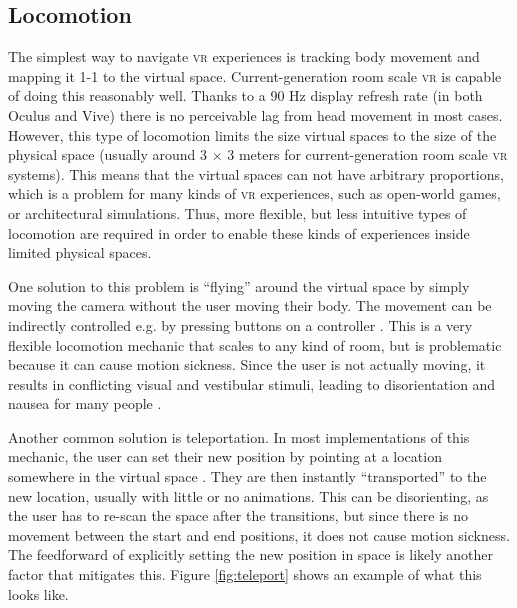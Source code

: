 \documentclass[nobib]{tufte-book} %
\begin{document}
\subsection{Locomotion}
The simplest way to navigate \textsc{vr} experiences is tracking body movement and mapping it 1-1 to the virtual space. Current-generation room scale \textsc{vr} is capable of doing this reasonably well. Thanks to a 90 Hz display refresh rate (in both Oculus and Vive) there is no perceivable lag from head movement in most cases. However, this type of locomotion limits the size virtual spaces to the size of the physical space (usually around $3$ $\times$ $3$ meters for current-generation room scale \textsc{vr} systems). This means that the virtual spaces can not have arbitrary proportions, which is a problem for many kinds of \textsc{vr} experiences, such as open-world games, or architectural simulations. Thus, more flexible, but less intuitive types of locomotion are required in order to enable these kinds of experiences inside limited physical spaces.

One solution to this problem is ``flying'' around the virtual space by simply moving the camera without the user moving their body. The movement can be indirectly controlled e.g. by pressing buttons on a controller \cite{bowman1996evaluation}. This is a very flexible locomotion mechanic that scales to any kind of room, but is problematic because it can cause motion sickness. Since the user is not actually moving, it results in conflicting visual and vestibular stimuli, leading to disorientation and nausea for many people \cite{akiduki2003visual}.

Another common solution is teleportation. In most implementations of this mechanic, the user can set their new position by pointing at a location somewhere in the virtual space \cite{bozgeyikli2016point}. They are then instantly ``transported'' to the new location, usually with little or no animations. This can be disorienting, as the user has to re-scan the space after the transitions, but since there is no movement between the start and end positions, it does not cause motion sickness. The feedforward of explicitly setting the new position in space is likely another factor that mitigates this. Figure \ref{fig:teleport} shows an example of what this looks like.
\end{document}
